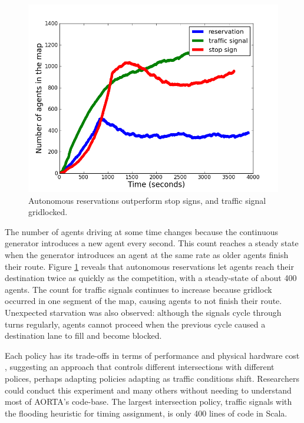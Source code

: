 \documentclass[letterpaper, 10 pt, conference]{ieeeconf}  %
\begin{document}

\begin{figure}[h]
  \centering \includegraphics[width=\linewidth]{agent_cnt_atx.png}
  \caption{Autonomous reservations outperform stop signs, and traffic signal
           gridlocked.}
  \label{fig:agent_cnt}
  \vspace{-10pt}
\end{figure}

The number of agents driving at some time changes because the continuous
generator introduces a new agent every second. This count reaches a steady
state when the generator introduces an agent at the same rate as older agents
finish their route. Figure \ref{fig:agent_cnt} reveals that autonomous
reservations let agents reach their destination twice as quickly as the
competition, with a steady-state of about 400 agents. The count for traffic
signals continues to increase because gridlock occurred in one segment of the
map, causing agents to not finish their route.  Unexpected starvation was also
observed: although the signals cycle through turns regularly, agents cannot
proceed when the previous cycle caused a destination lane to fill and become
blocked.

Each policy has its trade-offs in terms of performance and physical hardware
cost , suggesting an approach that
controls different intersections with different polices, perhaps adapting
policies adapting as traffic conditions shift.  Researchers could conduct this
experiment and many others without needing to understand most of AORTA's
code-base. The largest intersection policy, traffic signals with the flooding
heuristic for timing assignment, is only 400 lines of code in Scala.
\end{document}
